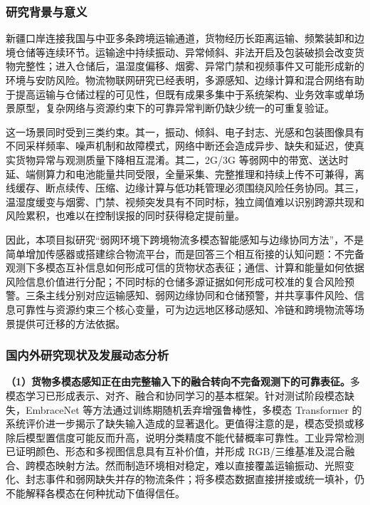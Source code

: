 \justifying
\NSFCBodyText

\subsubsection{研究背景与意义}

新疆口岸连接我国与中亚多条跨境运输通道，货物经历长距离运输、频繁装卸和边境仓储等连续环节。运输途中持续振动、异常倾斜、非法开启及包装破损会改变货物完整性；进入仓储后，温湿度偏移、烟雾、异常门禁和视频事件又可能形成新的环境与安防风险。物流物联网研究已经表明，多源感知、边缘计算和混合网络有助于提高运输与仓储过程的可见性，但既有成果多集中于系统架构、业务效率或单场景原型，复杂网络与资源约束下的可靠异常判断仍缺少统一的可重复验证\cite{internetofthings2019,iotbasedsupply2023,applicationsofthe2022,maritimeterminalscargo2023,hybridiotnetwork2025}。

这一场景同时受到三类约束。其一，振动、倾斜、电子封志、光感和包装图像具有不同采样频率、噪声机制和故障模式，网络中断还会造成异步、缺失和延迟，使真实货物异常与观测质量下降相互混淆。其二，2G/3G 等弱网中的带宽、送达时延、端侧算力和电池能量共同受限，全量采集、完整推理和持续上传不可兼得，离线缓存、断点续传、压缩、边缘计算与低功耗管理必须围绕风险任务协同。其三，温湿度缓变与烟雾、门禁、视频突发具有不同时标，独立阈值难以识别跨源共现和风险累积，也难以在控制误报的同时获得稳定提前量。

因此，本项目拟研究“弱网环境下跨境物流多模态智能感知与边缘协同方法”，不是简单增加传感器或搭建综合物流平台，而是回答三个相互衔接的认知问题：不完备观测下多模态互补信息如何形成可信的货物状态表征；通信、计算和能量如何依据风险信息价值进行分配；不同时标的仓储多源证据如何形成可校准的复合风险预警。三条主线分别对应运输感知、弱网边缘协同和仓储预警，并共享事件风险、信息可靠性与资源约束三个核心变量，可为边远地区移动感知、冷链和跨境物流等场景提供可迁移的方法依据。

\subsubsection{国内外研究现状及发展动态分析}

\textbf{（1）货物多模态感知正在由完整输入下的融合转向不完备观测下的可靠表征。}多模态学习已形成表示、对齐、融合和协同学习的基本框架\cite{multimodalmachinelearning2018,multimodallearningwith2023}。针对测试阶段模态缺失，EmbraceNet 等方法通过训练期随机丢弃增强鲁棒性，多模态 Transformer 的系统评价进一步揭示了缺失输入造成的显著退化\cite{embracenetarobust2019,aremultimodaltransformers2022}。更值得注意的是，模态受损或移除后模型置信度可能反而升高，说明分类精度不能代替概率可靠性\cite{calibratingmultimodallearning2023}。工业异常检测已证明颜色、形态和多视图信息具有互补价值，并形成 RGB/三维基准及混合融合、跨模态映射方法\cite{themvtec3d2022,multimodalindustrialanomaly2023,multimodalindustrialanomaly2024}。然而制造环境相对稳定，难以直接覆盖运输振动、光照变化、封志事件和弱网缺失并存的物流条件；将多模态数据直接拼接或统一填补，仍不能解释各模态在何种扰动下值得信任。

